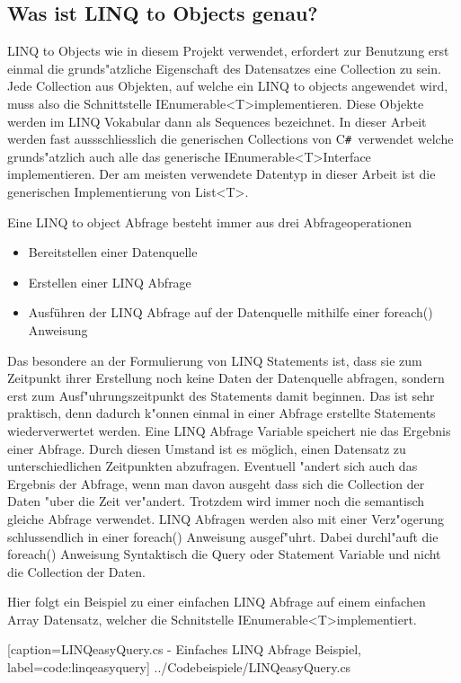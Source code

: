 \documentclass[pagesize, paper=a4, fontsize=12pt,titlepage=true, headings=small, headnosepline, abstractoff, liststotoc, nochapterprefix, plainheadsepline]{scrreprt}
\newcommand{\CSS}{C\texttt{\# }}
\newcommand{\GT}{\textless T\textgreater}
\newcommand{\GTS}{\textless T\textgreater\space}
\begin{document}
		\subsection {Was ist LINQ to Objects genau? }
		LINQ to Objects wie in diesem Projekt verwendet, erfordert zur Benutzung erst einmal die grunds"atzliche Eigenschaft des Datensatzes eine Collection zu sein. Jede Collection aus Objekten, auf welche ein LINQ to objects angewendet wird, muss also die Schnittstelle IEnumerable\GTS implementieren. Diese Objekte werden im LINQ Vokabular dann als Sequences bezeichnet. In dieser Arbeit werden fast aussschliesslich die generischen Collections von \CSS verwendet welche grunds"atzlich auch alle das generische IEnumerable\GTS Interface implementieren. Der am meisten verwendete Datentyp in dieser Arbeit ist die generischen Implementierung von List\GT.

Eine LINQ to object Abfrage besteht immer aus drei Abfrageoperationen
\begin{itemize}
\item Bereitstellen einer Datenquelle
\item Erstellen einer LINQ Abfrage
\item Ausführen der LINQ Abfrage auf der Datenquelle mithilfe einer foreach() Anweisung
\end{itemize}
Das besondere an der Formulierung von LINQ Statements ist, dass sie zum Zeitpunkt ihrer Erstellung noch keine Daten der Datenquelle abfragen, sondern erst zum Ausf"uhrungszeitpunkt des Statements damit beginnen. Das ist sehr praktisch, denn dadurch k"onnen einmal in einer Abfrage erstellte Statements wiederverwertet werden. Eine LINQ Abfrage Variable speichert nie das Ergebnis einer Abfrage. Durch diesen Umstand ist es möglich, einen Datensatz zu unterschiedlichen Zeitpunkten abzufragen. Eventuell "andert sich auch das Ergebnis der Abfrage, wenn man davon ausgeht dass sich die Collection der Daten "uber die Zeit ver"andert. Trotzdem wird immer noch die semantisch gleiche Abfrage verwendet. LINQ Abfragen werden also mit einer Verz"ogerung schlussendlich in einer foreach() Anweisung ausgef"uhrt. Dabei durchl"auft die foreach() Anweisung Syntaktisch die Query oder Statement Variable und nicht die Collection der Daten.
\newline

Hier folgt ein Beispiel zu einer einfachen LINQ Abfrage auf einem einfachen Array Datensatz, welcher die Schnitstelle IEnumerable\GTS implementiert.

			[caption={LINQeasyQuery.cs - Einfaches LINQ Abfrage Beispiel}, label=code:linqeasyquery]
			{../Codebeispiele/LINQeasyQuery.cs}
\end{document}
